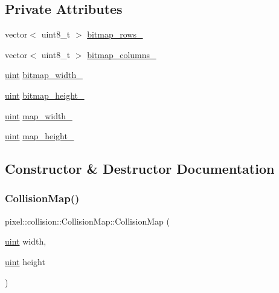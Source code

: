 \subsection*{Private Attributes}
\begin{DoxyCompactItemize}
\item 
vector$<$ uint8\+\_\+t $>$ \hyperlink{classpixel_1_1collision_1_1_collision_map_a9500d6d9822018355058fd9f58563a34}{bitmap\+\_\+rows\+\_\+}
\item 
vector$<$ uint8\+\_\+t $>$ \hyperlink{classpixel_1_1collision_1_1_collision_map_adfad13a45d1e3c1b88b674e08613a94c}{bitmap\+\_\+columns\+\_\+}
\item 
\hyperlink{namespacepixel_a6706355faabffaabebd430b2fa55843a}{uint} \hyperlink{classpixel_1_1collision_1_1_collision_map_aadad7aa7bdfb345b83a39c5884e4ea2e}{bitmap\+\_\+width\+\_\+}
\item 
\hyperlink{namespacepixel_a6706355faabffaabebd430b2fa55843a}{uint} \hyperlink{classpixel_1_1collision_1_1_collision_map_af7cfb78af620a0d0d419d240150f6a1d}{bitmap\+\_\+height\+\_\+}
\item 
\hyperlink{namespacepixel_a6706355faabffaabebd430b2fa55843a}{uint} \hyperlink{classpixel_1_1collision_1_1_collision_map_a64495af476c19c01be52af4312d147d5}{map\+\_\+width\+\_\+}
\item 
\hyperlink{namespacepixel_a6706355faabffaabebd430b2fa55843a}{uint} \hyperlink{classpixel_1_1collision_1_1_collision_map_a5675e0fd02f93fe970816d8ed1006dcb}{map\+\_\+height\+\_\+}
\end{DoxyCompactItemize}


\subsection{Constructor \& Destructor Documentation}
\mbox{\label{classpixel_1_1collision_1_1_collision_map_ad4b43c70e9f33a560d2f9ed9f0a2455c}} 
\subsubsection{\texorpdfstring{Collision\+Map()}{CollisionMap()}}
{\footnotesize\ttfamily pixel\+::collision\+::\+Collision\+Map\+::\+Collision\+Map (\begin{DoxyParamCaption}\item[{\hyperlink{namespacepixel_a6706355faabffaabebd430b2fa55843a}{uint}}]{width,  }\item[{\hyperlink{namespacepixel_a6706355faabffaabebd430b2fa55843a}{uint}}]{height }\end{DoxyParamCaption})}




